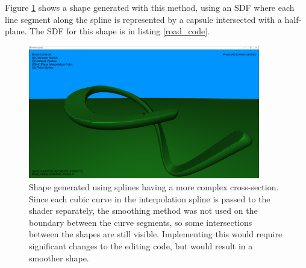 \documentclass[11pt]{article}
\begin{document}
Figure \ref{fig:bezier_roads} shows a shape generated with this method, using an SDF where each line segment along the spline is represented by a capsule intersected with a half-plane. The SDF for this shape is in listing \ref{road_code}.

\begin{figure}[H]
  \begin{center}
  \includegraphics[width=0.9\textwidth]{bezier_roads.png}
  \end{center}  
  \caption{Shape generated using splines having a more complex cross-section. Since each cubic curve in the interpolation spline is passed to the shader separately, the smoothing method was not used on the boundary between the curve segments, so some intersections between the shapes are still visible. Implementing this would require significant changes to the editing code, but would result in a smoother shape.}
  \label{fig:bezier_roads}
\end{figure}
\end{document}
